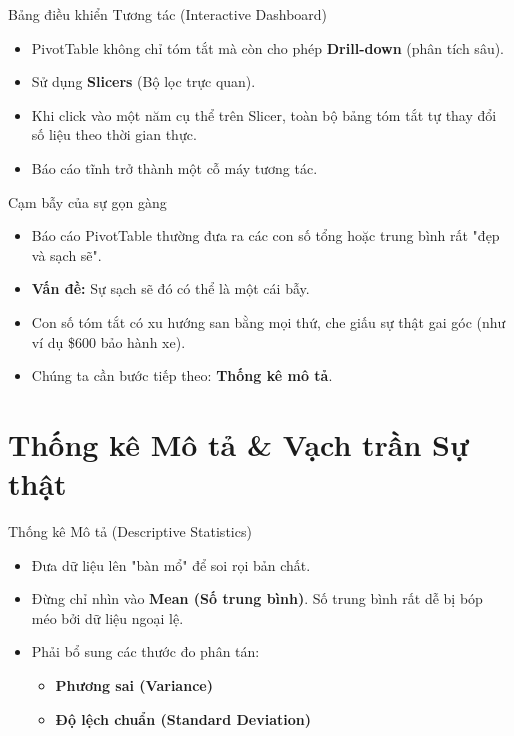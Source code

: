 \documentclass[aspectratio=169,12pt]{beamer}
\begin{document}
\begin{frame}{Bảng điều khiển Tương tác (Interactive Dashboard)}
    \begin{itemize}
        \item PivotTable không chỉ tóm tắt mà còn cho phép \textbf{Drill-down} (phân tích sâu).
        \item Sử dụng \textbf{Slicers} (Bộ lọc trực quan).
        \item Khi click vào một năm cụ thể trên Slicer, toàn bộ bảng tóm tắt tự thay đổi số liệu theo thời gian thực.
        \item Báo cáo tĩnh trở thành một cỗ máy tương tác.
    \end{itemize}
\end{frame}

\begin{frame}{Cạm bẫy của sự gọn gàng}
    \begin{itemize}
        \item Báo cáo PivotTable thường đưa ra các con số tổng hoặc trung bình rất "đẹp và sạch sẽ".
        \item \textbf{Vấn đề:} Sự sạch sẽ đó có thể là một cái bẫy.
        \item Con số tóm tắt có xu hướng san bằng mọi thứ, che giấu sự thật gai góc (như ví dụ \$600 bảo hành xe).
        \item Chúng ta cần bước tiếp theo: \textbf{Thống kê mô tả}.
    \end{itemize}
\end{frame}


\section{Thống kê Mô tả \& Vạch trần Sự thật}
\begin{frame}
    \tableofcontents[currentsection]
\end{frame}

\begin{frame}{Thống kê Mô tả (Descriptive Statistics)}
    \begin{itemize}
        \item Đưa dữ liệu lên "bàn mổ" để soi rọi bản chất.
        \item Đừng chỉ nhìn vào \textbf{Mean (Số trung bình)}. Số trung bình rất dễ bị bóp méo bởi dữ liệu ngoại lệ.
        \item Phải bổ sung các thước đo phân tán:
        \begin{itemize}
            \item \textbf{Phương sai (Variance)}
            \item \textbf{Độ lệch chuẩn (Standard Deviation)}
        \end{itemize}
    \end{itemize}
\end{frame}
\end{document}
